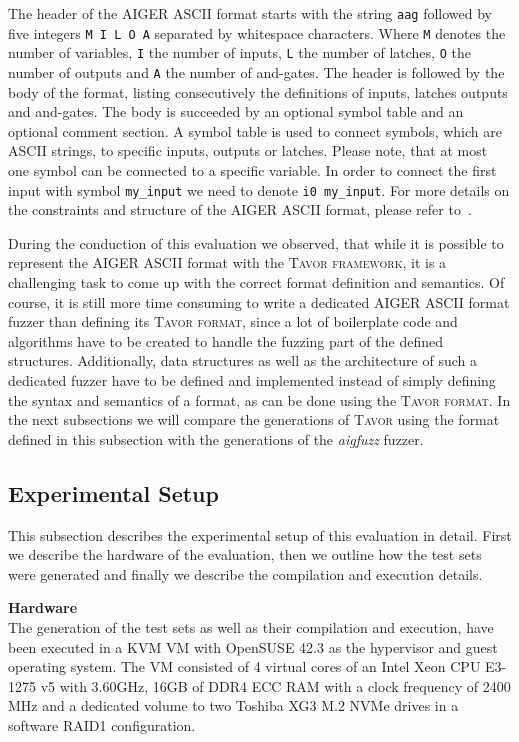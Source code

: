 The header of the AIGER ASCII format starts with the string \texttt{aag} followed by five integers \texttt{M I L O A} separated by whitespace characters. Where \texttt{M} denotes the number of variables, \texttt{I} the number of inputs, \texttt{L} the number of latches, \texttt{O} the number of outputs and \texttt{A} the number of and-gates. The header is followed by the body of the format, listing consecutively the definitions of inputs, latches outputs and and-gates. The body is succeeded by an optional symbol table and an optional comment section. A symbol table is used to connect symbols, which are ASCII strings, to specific inputs, outputs or latches. Please note, that at most one symbol can be connected to a specific variable. In order to connect the first input with symbol \texttt{my\_input} we need to denote \texttt{i0 my\_input}. For more details on the constraints and structure of the AIGER ASCII format, please refer to~\cite{biere2007aiger}.

During the conduction of this evaluation we observed, that while it is possible to represent the AIGER ASCII format with the \textsc{Tavor framework}, it is a challenging task to come up with the correct format definition and semantics. Of course, it is still more time consuming to write a dedicated AIGER ASCII format fuzzer than defining its \textsc{Tavor format}, since a lot of boilerplate code and algorithms have to be created to handle the fuzzing part of the defined structures. Additionally, data structures as well as the architecture of such a dedicated fuzzer have to be defined and implemented instead of simply defining the syntax and semantics of a format, as can be done using the \textsc{Tavor format}. In the next subsections we will compare the generations of \textsc{Tavor} using the format defined in this subsection with the generations of the \emph{aigfuzz} fuzzer.

\subsection{Experimental Setup}
\label{subsec:evaluationAigerExperimentalSetup}

This subsection describes the experimental setup of this evaluation in detail. First we describe the hardware of the evaluation, then we outline how the test sets were generated and finally we describe the compilation and execution details.

\textbf{Hardware}\\
The generation of the test sets as well as their compilation and execution, have been executed in a KVM VM with OpenSUSE 42.3 as the hypervisor and guest operating system. The VM consisted of 4 virtual cores of an Intel Xeon CPU E3-1275 v5 with 3.60GHz, 16GB of DDR4 ECC RAM with a clock frequency of 2400 MHz and a dedicated volume to two Toshiba XG3 M.2 NVMe drives in a software RAID1 configuration.

